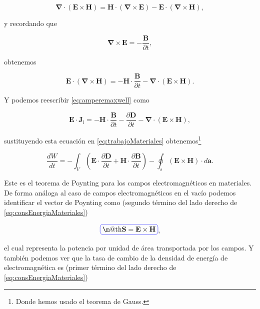 \documentclass[a4paper,11pt]{article}
\makeatletter
\numberwithin{equation}{section}
\newcommand*{\boxcolor}{blue}
\renewcommand{\boxed}[1]{\textcolor{\boxcolor}{%
\tikz[baseline={([yshift=-1ex]current bounding box.center)}] \node [rectangle, minimum width=1ex,rounded corners,draw] {\normalcolor\m@th$\displaystyle#1$};}}
\makeatother
\begin{document}
\begin{equation}
 \mathbf{\nabla} \cdot (\mathbf{E} \times \mathbf{H}) = \mathbf{H} \cdot 
 (\mathbf{\nabla} \times \mathbf{E}) - \mathbf{E}\cdot (\mathbf{\nabla} \times 
 \mathbf{H}),
\end{equation}

y recordando que 

\begin{equation}
 \mathbf{\nabla} \times \mathbf{E} = - \frac{\mathbf{B}}{\partial t},
\end{equation}

obtenemos 

\begin{equation}
  \mathbf{E}\cdot (\mathbf{\nabla} \times 
 \mathbf{H}) = - \mathbf{H}\cdot \frac{\mathbf{B}}{\partial t} - 
 \mathbf{\nabla} \cdot (\mathbf{E} \times \mathbf{H}).
\end{equation}

Y podemos reescribir \eqref{eq:amperemaxwell} como 

\begin{equation}
 \mathbf{E} \cdot \mathbf{J}_l = - \mathbf{H}\cdot \frac{\mathbf{B}}{\partial t}
 - \frac{\partial \mathbf{D}}{\partial t} - \mathbf{\nabla} \cdot (\mathbf{E} \times \mathbf{H}),
\end{equation}

sustituyendo esta ecuación en \eqref{eq:trabajoMateriales} obtenemos\footnote{Donde 
hemos usado el teorema de Gauss.}

\begin{equation}
 \frac{dW}{dt} = - \int_V \left(\mathbf{E} \cdot \frac{\partial \mathbf{D}}{\partial 
 t} + \mathbf{H}\cdot\frac{\partial \mathbf{B}}{\partial t} \right) - 
 \oint_s (\mathbf{E} \times \mathbf{H})\cdot d\mathbf{a}.
 \label{eq:consEnergiaMateriales}
\end{equation}

Este es el teorema de Poynting para los campos electromagnéticos en materiales. De 
forma análoga al caso de campos electromagnéticos en el vacío podemos identificar 
el vector de Poynting como (segundo término del lado derecho 
de \eqref{eq:consEnergiaMateriales}) 

\begin{equation}
 \boxed{\mathbf{S} = \mathbf{E} \times \mathbf{H}},
\end{equation}

el cual representa la potencia por unidad de área transportada por los campos. Y 
también podemos ver que la tasa de cambio de la densidad de energía de 
electromagnética es (primer término del lado derecho 
de \eqref{eq:consEnergiaMateriales})
\end{document}
